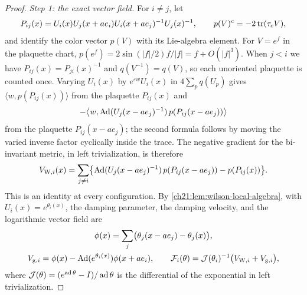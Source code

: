 \begin{proof}
\emph{Step 1: the exact vector field.} For $i\ne j$, let
\[
 P_{ij}(x)=U_i(x)U_j(x+ae_i)U_i(x+ae_j)^{-1}U_j(x)^{-1},
 \qquad
 p(V)^c=-2\operatorname{tr}(\tau_cV),
\]
and identify the color vector $p(V)$ with its Lie-algebra element. For $V=e^f$ in the plaquette chart, $p(e^f)=2\sin(|f|/2)f/|f|=f+O(|f|^3)$. When $j<i$ we have $P_{ij}(x)=P_{ji}(x)^{-1}$ and $q(V^{-1})=q(V)$, so each unoriented plaquette is counted once. Varying $U_i(x)$ by $e^{\varepsilon w}U_i(x)$ in $4\sum_pq(U_p)$ gives $\langle w,p(P_{ij}(x))\rangle$ from the plaquette $P_{ij}(x)$ and
\[
 -\bigl\langle w,\operatorname{Ad}(U_j(x-ae_j)^{-1})\,p(P_{ij}(x-ae_j))\bigr\rangle
\]
from the plaquette $P_{ij}(x-ae_j)$; the second formula follows by moving the varied inverse factor cyclically inside the trace. The negative gradient for the bi-invariant metric, in left trivialization, is therefore
\begin{equation}\label{ch22:eq:staple-force}
 V_{{\rm W},i}(x)=\sum_{j\ne i}\bigl\{\operatorname{Ad}(U_j(x-ae_j)^{-1})\,p(P_{ij}(x-ae_j))-p(P_{ij}(x))\bigr\}.
\end{equation}
This is an identity at every configuration. By \cref{ch21:lem:wilson-local-algebra}, with $U_i(x)=e^{\theta_i(x)}$, the damping parameter, the damping velocity, and the logarithmic vector field are
\begin{equation}\label{ch22:eq:full-log-force}
 \begin{gathered}
 \phi(x)=\sum_j\bigl(\theta_j(x-ae_j)-\theta_j(x)\bigr),\\
 V_{{\rm g},i}=\phi(x)-\operatorname{Ad}(e^{\theta_i(x)})\phi(x+ae_i),\qquad
 \mathcal F_i(\theta)=\mathcal J(\theta_i)^{-1}\bigl(V_{{\rm W},i}+V_{{\rm g},i}\bigr),
 \end{gathered}
\end{equation}
where $\mathcal J(\theta)=(e^{\operatorname{ad}\theta}-I)/\operatorname{ad}\theta$ is the differential of the exponential in left trivialization.


\end{proof}
